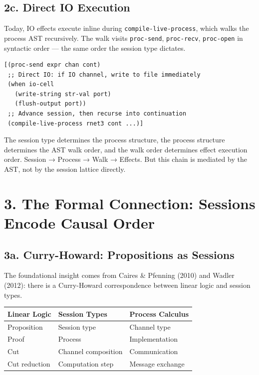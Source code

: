 \documentclass[11pt]{article}
\begin{document}
\subsection{2c. Direct IO Execution}
\label{sec:org93e16e7}

Today, IO effects execute inline during \texttt{compile-live-process}, which walks the
process AST recursively. The walk visits \texttt{proc-send}, \texttt{proc-recv}, \texttt{proc-open}
in syntactic order — the same order the session type dictates.

\begin{verbatim}
[(proc-send expr chan cont)
 ;; Direct IO: if IO channel, write to file immediately
 (when io-cell
   (write-string str-val port)
   (flush-output port))
 ;; Advance session, then recurse into continuation
 (compile-live-process rnet3 cont ...)]
\end{verbatim}

The session type determines the process structure, the process structure
determines the AST walk order, and the walk order determines effect execution
order. Session → Process → Walk → Effects. But this chain is mediated by the
AST, not by the session lattice directly.
\section{3. The Formal Connection: Sessions Encode Causal Order}
\label{sec:org5ff5071}

\subsection{3a. Curry-Howard: Propositions as Sessions}
\label{sec:org47b8ee3}

The foundational insight comes from Caires \& Pfenning (2010) and Wadler (2012):
there is a Curry-Howard correspondence between linear logic and session types.

\begin{center}
\begin{tabular}{lll}
Linear Logic & Session Types & Process Calculus\\
\hline
Proposition & Session type & Channel type\\
Proof & Process & Implementation\\
Cut & Channel composition & Communication\\
Cut reduction & Computation step & Message exchange\\
\end{tabular}
\end{center}
\end{document}
